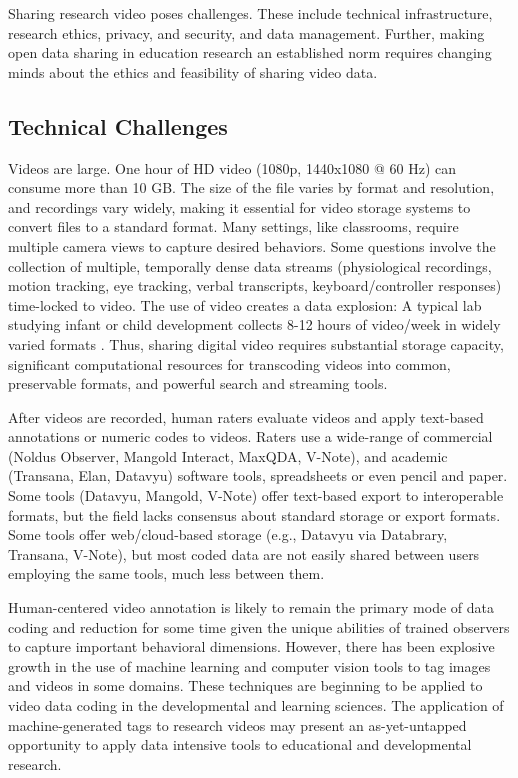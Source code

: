 \documentclass[letterpaper,man,apacite]{apa6}
\begin{document}
Sharing research video poses challenges.
These include technical infrastructure, research ethics, privacy, and security, and data management. 
Further, making open data sharing in education research an established norm requires changing minds about the ethics and feasibility of sharing video data. 

\subsection{Technical Challenges}

Videos are large.
One hour of HD video (1080p, 1440x1080 @ 60 Hz) can consume more than 10 GB.
The size of the file varies by format and resolution, and recordings vary widely, making it essential for video storage systems to convert files to a standard format.
Many settings, like classrooms, require multiple camera views to capture desired behaviors.
Some questions involve the collection of multiple, temporally dense data streams (physiological recordings, motion tracking, eye tracking, verbal transcripts, keyboard/controller responses) time-locked to video.
The use of video creates a data explosion: A typical lab studying infant or child development collects 8-12 hours of video/week in widely varied formats \cite{Survey2012}. 
Thus, sharing digital video requires substantial storage capacity, significant computational resources for transcoding videos into common, preservable formats, and powerful search and streaming tools. 

After videos are recorded, human raters evaluate videos and apply text-based annotations or numeric codes to videos.
Raters use a wide-range of commercial (Noldus Observer, Mangold Interact, MaxQDA, V-Note), and academic (Transana, Elan, Datavyu) software tools, spreadsheets or even pencil and paper.
Some tools (Datavyu, Mangold, V-Note) offer text-based export to interoperable formats, but the field lacks consensus about standard storage or export formats.
Some tools offer web/cloud-based storage (e.g., Datavyu via Databrary, Transana, V-Note), but most coded data are not easily shared between users employing the same tools, much less between them.

Human-centered video annotation is likely to remain the primary mode of data coding and reduction for some time given the unique abilities of trained observers to capture important behavioral dimensions.
However, there has been explosive growth in the use of machine learning and computer vision tools to tag images and videos \cite{Google2014} in some domains. 
These techniques are beginning \cite{Amso2014,ChenYu2013,Raudies2014,Fathi2012} to be applied to video data coding in the developmental and learning sciences. 
The application of machine-generated tags to research videos may present an as-yet-untapped opportunity to apply data intensive tools to educational and developmental research.
\end{document}
